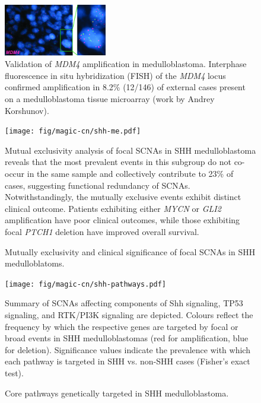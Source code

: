 \documentclass[11pt,letterpaper]{article}
\theoremstyle{definition}
\begin{document}
\begin{figure}
	\centering
	\includegraphics[width=0.4\textwidth]{fig/magic-cn/mdm4-fish.jpg}
	\caption{Validation of \emph{MDM4} amplification in medulloblastoma.
	Interphase fluorescence in situ hybridization (FISH) of the \emph{MDM4} locus confirmed amplification in 8.2\% (12/146) of external cases present on a medulloblastoma tissue microarray (work by Andrey Korshunov).}
	\label{fig:mdm4-fish}
\end{figure}

\clearpage

\begin{figure}[h]
	\begin{center}
		\texttt{[image: fig/magic-cn/shh-me.pdf]}
	\end{center}
	\caption{Mutually exclusivity and clinical significance of focal SCNAs in SHH medulloblatoms.}
	Mutual exclusivity analysis of focal SCNAs in SHH medulloblastoma reveals that the most prevalent events in this subgroup do not co-occur in the same sample and collectively contribute to 23\% of cases, suggesting functional redundancy of SCNAs. Notwithstandingly, the mutually exclusive events exhibit distinct clinical outcome. Patients exhibiting either \emph{MYCN} or \emph{GLI2} amplification have poor clinical outcomes, while those exhibiting focal \emph{PTCH1} deletion have improved overall survival.
	\label{fig:shh-me}
\end{figure}

\begin{figure}[h]
	\begin{center}
		\texttt{[image: fig/magic-cn/shh-pathways.pdf]}
	\end{center}
	\caption{Core pathways genetically targeted in SHH medulloblastoma.}
	Summary of SCNAs affecting components of Shh signaling, TP53 signaling, and RTK/PI3K signaling are depicted. Colours reflect the frequency by which the respective genes are targeted by focal or broad events in SHH medulloblastomas (red for amplification, blue for deletion). Significance values indicate the prevalence with which each pathway is targeted in SHH vs. non-SHH cases (Fisher's exact test).
	\label{fig:shh-pathways}
\end{figure}
\end{document}
